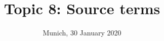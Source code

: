 %
% 
% 
%





\usepackage{amsmath}
\usepackage{bm}
\newcommand{\Datum}{\today}

\renewcommand{\PraesentationFusszeileZusatz}{| Seminar WaveSim | Topic 8: Source terms}

\title{Topic 8: Source terms}
\author{\PersonTitel{} \PersonVorname{} \PersonNachname}
\institute[]{\UniversitaetName \\ \FakultaetName \\ \LehrstuhlName}
\date[\Datum]{Munich, 30 January 2020}
\subject{Thema der Präsentation}



\setlength{\baselineskip}{\PraesentationAbstandAbsatz}
\setlength{\parskip}{\baselineskip}


\PraesentationMasterStandard


\PraesentationMasterKopfzeileDreizeiler

